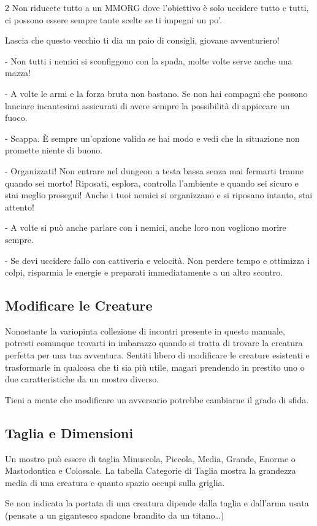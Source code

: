 \begin{multicols}{2}
Non riducete tutto a un MMORG dove l'obiettivo è solo uccidere tutto e tutti, ci possono essere sempre tante scelte se ti impegni un po'.

\begin{giocatore}
{
Lascia che questo vecchio ti dia un paio di consigli, giovane avventuriero!

- Non tutti i nemici si sconfiggono con la spada, molte volte serve anche una mazza!

- A volte le armi e la forza bruta non bastano. Se non hai compagni che possono lanciare incantesimi assicurati di avere sempre la possibilità di appiccare un fuoco.

- Scappa. È sempre un'opzione valida se hai modo e vedi che la situazione non promette niente di buono.

- Organizzati! Non entrare nel dungeon a testa bassa senza mai fermarti tranne quando sei morto! Riposati, esplora, controlla l'ambiente e quando sei sicuro e stai meglio prosegui! Anche i tuoi nemici si organizzano e si riposano intanto, stai attento!

- A volte si può anche parlare con i nemici, anche loro non vogliono morire sempre.

- Se devi uccidere fallo con cattiveria e velocità. Non perdere tempo e ottimizza i colpi, risparmia le energie e preparati immediatamente a un altro scontro.

}\end{giocatore}

\subsection{Modificare le Creature}

Nonostante la variopinta collezione di incontri presente in questo manuale, potresti comunque trovarti in imbarazzo quando si tratta di trovare la creatura perfetta per una tua avventura. Sentiti libero di modificare le creature esistenti e trasformarle in qualcosa che ti sia più utile, magari prendendo in prestito uno o due caratteristiche da un mostro diverso.

Tieni a mente che modificare un avversario potrebbe cambiarne il grado di sfida.

\subsection{Taglia e Dimensioni}

Un mostro può essere di taglia Minuscola, Piccola, Media, Grande, Enorme o Mastodontica e Colossale. La tabella Categorie di Taglia mostra la grandezza media di una creatura e quanto spazio occupi sulla griglia.

Se non indicata la portata di una creatura dipende dalla taglia e dall'arma usata (pensate a un gigantesco spadone brandito da un titano…)

\end{multicols}

